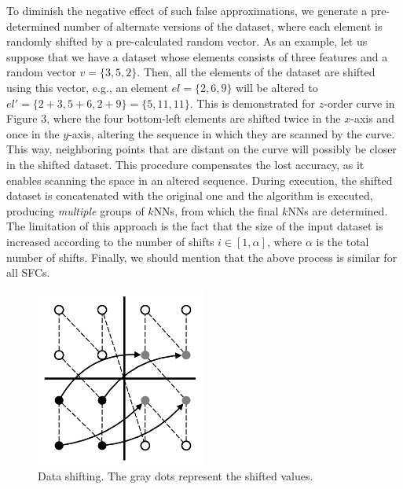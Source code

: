 To diminish the negative effect of such false approximations, we generate a pre-determined number of alternate versions of the dataset, where each element is randomly shifted by a pre-calculated random vector. As an example, let us suppose that we have a dataset whose elements consists of three features and a random vector $v=\{3, 5, 2\}$. Then, all the elements of the dataset are shifted using this vector, e.g., an element $el=\{2, 6, 9\}$ will be altered to $el'=\{2+3, 5+6, 2+9\}=\{5, 11, 11\}$. This is demonstrated for $z$-order curve in Figure 3, where the four bottom-left elements are shifted twice in the $x$-axis and once in the $y$-axis, altering the sequence in which they are scanned by the curve. This way, neighboring points that are distant on the curve will possibly be closer in the shifted dataset. This procedure compensates the lost accuracy, as it enables scanning the space in an altered sequence. During execution, the shifted dataset is concatenated with the original one and the algorithm is executed, producing \textit{multiple} groups of $k$NNs, from which the final $k$NNs are determined. The limitation of this approach is the fact that the size of the input dataset is increased according to the number of shifts $i\in{[1, \alpha]}$, where $\alpha$ is the total number of shifts. Finally, we should mention that the above process is similar for all SFCs.

\begin{figure}[h!]
	\centering
	\includegraphics[width=0.5\textwidth]{figures/figure3.pdf}
	\caption{Data shifting. The gray dots represent the shifted values.}
	\label{figure3}
\end{figure}


